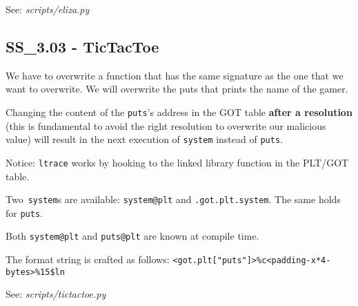 See: \textit{scripts/eliza.py}

\subsection{SS_3.03 - TicTacToe}
We have to overwrite a function that has the same signature as the one that we want to overwrite.
We will overwrite the puts that prints the name of the gamer.

Changing the content of the \texttt{puts}'s address in the GOT table \textbf{after a resolution} (this is fundamental to avoid the right resolution to overwrite our malicious value) will result in the next execution of \texttt{system} instead of \texttt{puts}. 

Notice: \texttt{ltrace} works by hooking to the linked library function in the PLT/GOT table.

Two\ \texttt{system}s are available: \texttt{system@plt} and \texttt{.got.plt.system}. The same holds for \texttt{puts}.

Both \texttt{system@plt} and \texttt{puts@plt} are known at compile time.

The format string is crafted as follows: \texttt{<got.plt["puts"]>\%<num-char-equivalent-to-system@plt-addr>c<padding-x*4-bytes>\%15\$ln}

See: \textit{scripts/tictactoe.py}